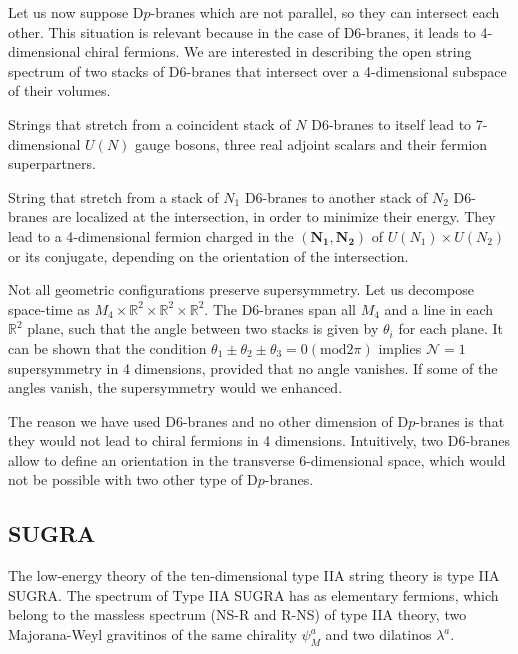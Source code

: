 Let us now suppose D$p$-branes which are not parallel, so they can intersect each other.
This situation is relevant because in the case of D6-branes, it leads to 4-dimensional chiral fermions.
We are interested in describing the open string spectrum of two stacks of D$6$-branes that intersect over a 4-dimensional subspace of their volumes.

Strings that stretch from a coincident stack of $N$ D6-branes to itself lead to 7-dimensional $U(N)$ gauge bosons, three real adjoint scalars and their fermion superpartners.

String that stretch from a stack of $N_1$ D6-branes to another stack of $N_2$ D6-branes are localized at the intersection,
in order to minimize their energy. 
They lead to a 4-dimensional fermion charged in the $(\mathbf{N_1},\mathbf{N_2})$ of $U(N_1)\times U(N_2)$ or its conjugate, depending on the orientation
of the intersection.

Not all geometric configurations preserve supersymmetry. 
Let us decompose space-time as $M_4 \times \mathbb R^2 \times \mathbb R^2 \times \mathbb R^2 $.
The D6-branes span all $M_4$ and a line in each $\mathbb R^2$ plane, such that the angle between
two stacks is given by $\theta_i$ for each plane.
It can be shown that the condition $\theta_1\pm\theta_2\pm\theta_3=0 (\mathrm{mod} 2\pi)$ implies $\mathcal N=1$ 
supersymmetry in 4 dimensions, provided that no angle vanishes.
If some of the angles vanish, the supersymmetry would we enhanced.

The reason we have used D6-branes and no other dimension of D$p$-branes is that they would not lead to chiral fermions in 4 dimensions.
Intuitively, two D6-branes allow to define an orientation in the transverse 6-dimensional space, which would not be possible
with two other type of D$p$-branes.


%


\subsection{SUGRA}
 
The low-energy theory of the ten-dimensional type IIA string theory is type IIA SUGRA.
The spectrum of Type IIA SUGRA has as elementary fermions, which belong to the massless spectrum (NS-R and R-NS) of type IIA theory,
two Majorana-Weyl gravitinos of the same chirality $\psi_M^a$ and two dilatinos $\lambda^a$. 
